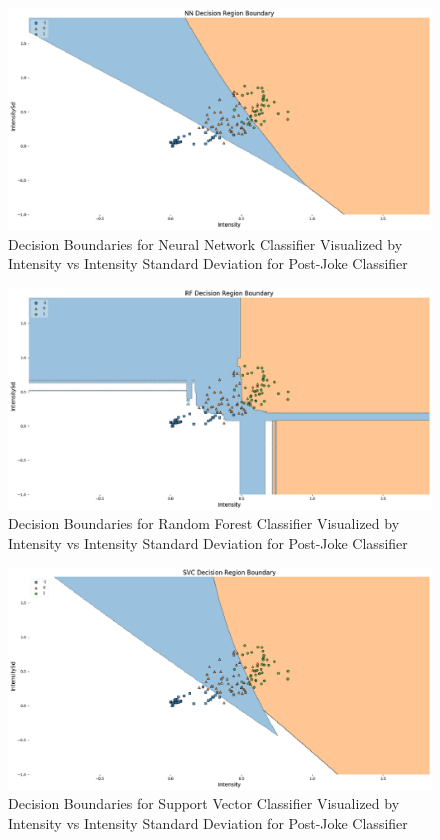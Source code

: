 \documentclass[onecolumn, draftclsnofoot,10pt, compsoc]{IEEEtran}
\begin{document}
\begin{figure}[!h]
\includegraphics[width=\linewidth]{assets/fig15.eps}
\caption{Decision Boundaries for Neural Network Classifier Visualized by Intensity vs Intensity Standard Deviation for Post-Joke Classifier}
\end{figure}

\begin{figure}[!h]
\includegraphics[width=\linewidth]{assets/fig16.eps}
\caption{Decision Boundaries for Random Forest Classifier Visualized by Intensity vs Intensity Standard Deviation for Post-Joke Classifier}
\end{figure}

\begin{figure}[!h]
\includegraphics[width=\linewidth]{assets/fig17.eps}
\caption{Decision Boundaries for Support Vector Classifier Visualized by Intensity vs Intensity Standard Deviation for Post-Joke Classifier}
\end{figure}
\end{document}
